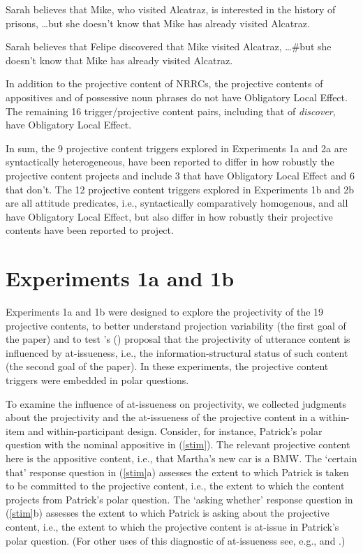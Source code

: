 \documentclass[11pt,fleqn]{article}
\newcommand{\6}{\mbox{$[\hspace*{-.6mm}[$}}
\newcommand{\9}{\mbox{$]\hspace*{-.6mm}]$}}
\newcommand{\citetpos}[1]{\citeauthor{#1}'s (\citeyear{#1})}
\begin{document}
\begin{exe}
\ex\label{ole}
\begin{xlist}
\ex Sarah believes that Mike, who visited Alcatraz, is interested in the history of prisons, \ldots but she doesn't know that Mike has already visited Alcatraz.

\ex Sarah believes that Felipe discovered that Mike visited Alcatraz, \ldots \#but she doesn't know that Mike has already visited Alcatraz. 

\end{xlist}
\end{exe}
In addition to the projective content of NRRCs, the projective contents of appositives and of possessive noun phrases do not have Obligatory Local Effect. The remaining 16 trigger/projective content pairs, including that of {\em discover}, have Obligatory Local Effect. 

In sum, the 9 projective content triggers explored in Experiments 1a and 2a are syntactically heterogeneous, have been reported to differ in how robustly the projective content projects and include 3 that have Obligatory Local Effect and 6 that don't. The 12 projective content triggers explored in Experiments 1b and 2b are all attitude predicates, i.e., syntactically comparatively homogenous, and all have Obligatory Local Effect, but also differ in how robustly their projective contents have been reported to project.


\section{Experiments 1a and 1b}\label{s3}

Experiments 1a and 1b were designed to explore the projectivity of the 19 projective contents, to better understand projection variability (the first goal of the paper) and to test \citetpos{brst-salt10} proposal that the projectivity of utterance content is influenced by at-issueness, i.e., the information-structural status of such content (the second goal of the paper). In these experiments, the projective content triggers were embedded in polar questions.

To examine the influence of at-issueness on projectivity, we collected judgments about the projectivity and the at-issueness of the projective content in a within-item and within-participant design. Consider, for instance, Patrick's polar question with the nominal appositive in (\ref{stim}). The relevant projective content here is the appositive content, i.e., that Martha's new car is a BMW. The `certain that' response question in (\ref{stim}a) assesses the extent to which Patrick is taken to be committed to the projective content, i.e., the extent to which the content projects from Patrick's polar question. The `asking whether' response question in (\ref{stim}b) assesses the extent to which Patrick is asking about the projective content, i.e., the extent to which the projective content is at-issue in Patrick's polar question. (For other uses of this diagnostic of at-issueness see, e.g., \citealt{amaral-etal07} and \citealt{tonhauser-sula6}.)
\end{document}
